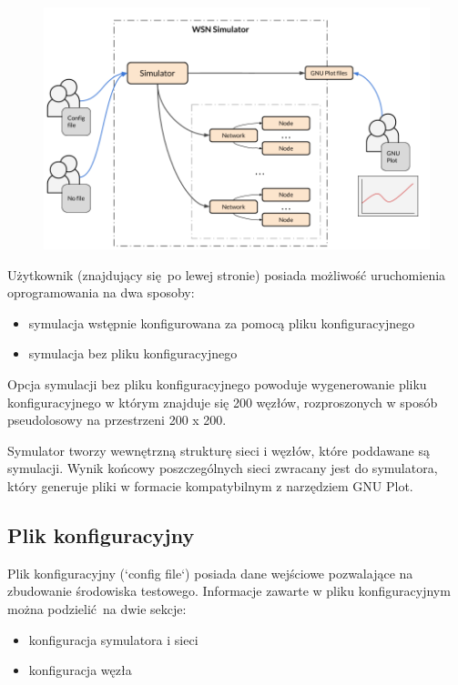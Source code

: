 \documentclass[a4paper,12pt,twoside,openany]{report}
\begin{document}
\begin{figure}[H]
 \centering
 \includegraphics[width=13cm]{images/architektura_systemu.png} 
\end{figure}

Użytkownik (znajdujący się po lewej stronie) posiada możliwość uruchomienia oprogramowania na dwa sposoby: 

\begin{itemize}
 \item symulacja wstępnie konfigurowana za pomocą pliku konfiguracyjnego
 \item symulacja bez pliku konfiguracyjnego
\end{itemize}

Opcja symulacji bez pliku konfiguracyjnego powoduje wygenerowanie pliku konfiguracyjnego w którym znajduje się 200 węzłów, rozproszonych w sposób
pseudolosowy na przestrzeni 200 x 200.

Symulator tworzy wewnętrzną strukturę sieci i węzłów, które poddawane są symulacji. Wynik końcowy poszczególnych sieci zwracany jest do symulatora, który
generuje pliki w formacie kompatybilnym z narzędziem GNU Plot. 

\subsection{Plik konfiguracyjny}

Plik konfiguracyjny (`config file`) posiada dane wejściowe pozwalające na zbudowanie środowiska testowego. 
Informacje zawarte w pliku konfiguracyjnym można podzielić na dwie sekcje:

\begin{itemize}
 \item konfiguracja symulatora i sieci
 \item konfiguracja węzła
\end{itemize}
\end{document}
